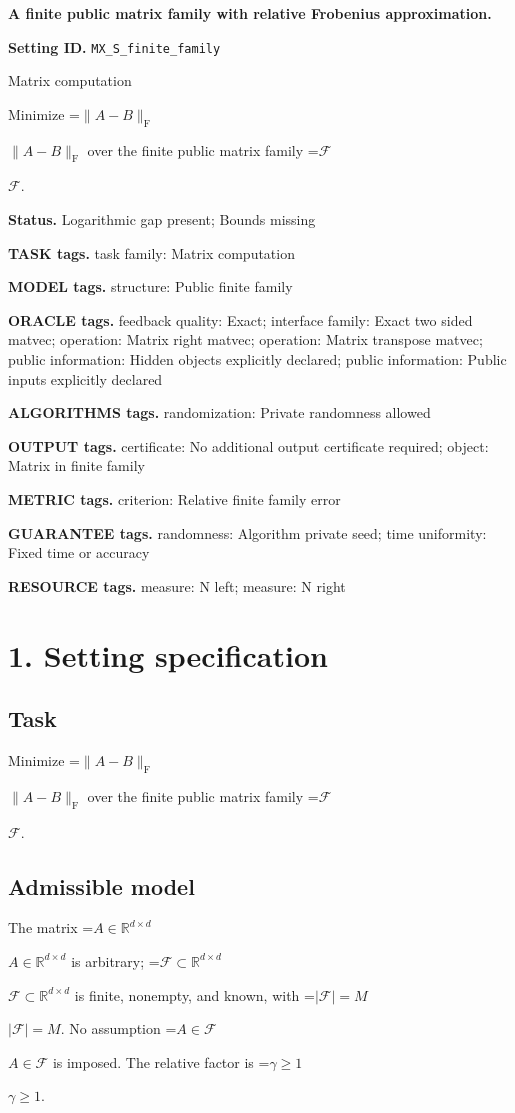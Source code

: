 \documentclass[10pt,a4paper]{article}
\newcommand{\AtlasMath}[1]{\par\begingroup\centering\setbox0=\hbox{$\displaystyle #1$}\ifdim\wd0>1.4\linewidth\typeout{ATLAS WIDE FORMULA: \the\wd0}\fi\ifdim\wd0>\linewidth\resizebox{\linewidth}{!}{\box0}\else\box0\fi\par\endgroup}
\newcommand{\AtlasInlineMath}[1]{\begingroup\setbox0=\hbox{$#1$}\ifdim\wd0>.4\linewidth\endgroup\AtlasMath{#1}\else\endgroup$#1$\fi}
\begin{document}
\raggedright

{\LARGE\bfseries\sffamily\color{AtlasNavy} A finite public matrix family with relative Frobenius approximation.\par}\vspace{5pt}
\textbf{Setting ID.} \texttt{MX\_\allowbreak{}S\_\allowbreak{}finite\_\allowbreak{}family}

Matrix computation

Minimize \AtlasInlineMath{\|A-B\|_{\mathrm{F}}} over the finite public matrix family \AtlasInlineMath{\mathcal{F}}.

\textbf{Status.} Logarithmic gap present; Bounds missing

\textbf{TASK tags.} task family: Matrix computation

\textbf{MODEL tags.} structure: Public finite family

\textbf{ORACLE tags.} feedback quality: Exact; interface family: Exact two sided matvec; operation: Matrix right matvec; operation: Matrix transpose matvec; public information: Hidden objects explicitly declared; public information: Public inputs explicitly declared

\textbf{ALGORITHMS tags.} randomization: Private randomness allowed

\textbf{OUTPUT tags.} certificate: No additional output certificate required; object: Matrix in finite family

\textbf{METRIC tags.} criterion: Relative finite family error

\textbf{GUARANTEE tags.} randomness: Algorithm private seed; time uniformity: Fixed time or accuracy

\textbf{RESOURCE tags.} measure: N left; measure: N right

\section{1. Setting specification}
\subsection{Task}
Minimize \AtlasInlineMath{\|A-B\|_{\mathrm{F}}} over the finite public matrix family \AtlasInlineMath{\mathcal{F}}.

\subsection{Admissible model}
The matrix \AtlasInlineMath{A\in\mathbb{R}^{d\times d}} is arbitrary; \AtlasInlineMath{\mathcal{F}\subset\mathbb{R}^{d\times d}} is finite, nonempty, and known, with \AtlasInlineMath{|\mathcal{F}|=M}. No assumption \AtlasInlineMath{A\in\mathcal{F}} is imposed. The relative factor is \AtlasInlineMath{\gamma\ge1}.
\end{document}
